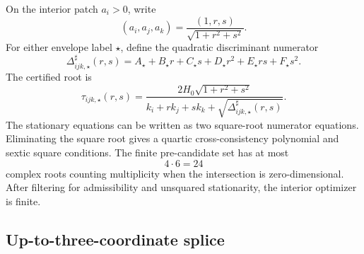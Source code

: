 On the interior patch \(a_i>0\), write
\begin{equation}
\label{eq:part06-triple-ratio-coords}
(a_i,a_j,a_k)=\frac{(1,r,s)}{\sqrt{1+r^2+s^2}}.
\end{equation}
For either envelope label \(\star\), define the quadratic discriminant numerator
\begin{equation}
\label{eq:part06-triple-discriminant}
\Delta_{ijk,\star}^{\sharp}(r,s)=
A_\star+B_\star r+C_\star s+D_\star r^2+E_\star rs+F_\star s^2.
\end{equation}
The certified root is
\begin{equation}
\label{eq:part06-triple-root}
\tau_{ijk,\star}(r,s)
=
\frac{2H_0\sqrt{1+r^2+s^2}}
{k_i+rk_j+sk_k+\sqrt{\Delta_{ijk,\star}^{\sharp}(r,s)}}.
\end{equation}
The stationary equations can be written as two square-root numerator equations.  Eliminating the square root gives a quartic cross-consistency polynomial and sextic square conditions.  The finite pre-candidate set has at most
\begin{equation}
\label{eq:part06-triple-bezout}
4\cdot 6=24
\end{equation}
complex roots counting multiplicity when the intersection is zero-dimensional.  After filtering for admissibility and unsquared stationarity, the interior optimizer is finite.

\subsection{Up-to-three-coordinate splice}
\label{subsec:part06-up-to-three-coordinate-splice}

